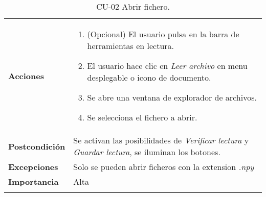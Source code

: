 \begin{longtable}[H]{@{}ll@{}}
\begin{minipage}[t]{0.23\columnwidth}
		\textbf{Acciones}\strut
	\end{minipage} & \begin{minipage}[t]{0.71\columnwidth}\raggedright\strut
		\begin{enumerate}
			\def\labelenumi{\arabic{enumi}.}
			\tightlist
			\item
			(Opcional) El usuario pulsa en la barra de herramientas en lectura.
			\item
			El usuario hace clic en \textit{Leer archivo} en menu desplegable o icono de documento.
			\item
			Se abre una ventana de explorador de archivos.
			\item
			Se selecciona el fichero a abrir.
		\end{enumerate}\strut
	\end{minipage}\tabularnewline
	\begin{minipage}[t]{0.23\columnwidth}\raggedright\strut
		\textbf{Postcondición}\strut
	\end{minipage} & \begin{minipage}[t]{0.71\columnwidth}\raggedright\strut
		Se activan las posibilidades de \textit{Verificar lectura} y \textit{Guardar lectura}, se iluminan los botones.\strut
	\end{minipage}\tabularnewline
	\begin{minipage}[t]{0.23\columnwidth}\raggedright\strut
		\textbf{Excepciones}\strut
	\end{minipage} & \begin{minipage}[t]{0.71\columnwidth}\raggedright\strut
		Solo se pueden abrir ficheros con la extension \textit{.npy}\strut
	\end{minipage}\tabularnewline
	\begin{minipage}[t]{0.23\columnwidth}\raggedright\strut
		\textbf{Importancia}\strut
	\end{minipage} & \begin{minipage}[t]{0.71\columnwidth}\raggedright\strut
		Alta\strut
	\end{minipage}\tabularnewline
	\bottomrule
	\caption{CU-02 Abrir fichero.}
\end{longtable}

\newpage

